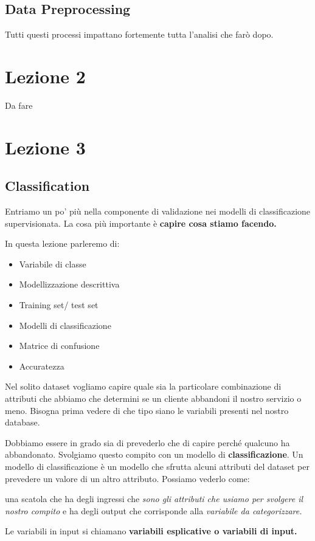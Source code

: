 \documentclass[12pt, a4paper,titlepage,openany]{article}
\begin{document}
\subsection{Data Preprocessing}

Tutti questi processi impattano fortemente tutta l'analisi che farò dopo.
\section{Lezione 2}
Da fare
\section{Lezione 3}
\subsection{Classification}
Entriamo un po' più nella componente di validazione nei modelli di classificazione supervisionata.
La cosa più importante è \textbf{capire cosa stiamo facendo.}

In questa lezione parleremo di:
\begin{itemize}
	\item Variabile di classe
	\item Modellizzazione descrittiva
	\item Training set/ test set
	\item Modelli di classificazione
	\item Matrice di confusione
	\item Accuratezza
\end{itemize}

Nel solito dataset vogliamo capire quale sia la particolare combinazione di attributi che abbiamo che determini se un cliente abbandoni il nostro servizio o meno.
Bisogna prima vedere di che tipo siano le variabili presenti nel nostro database.

Dobbiamo essere in grado sia di prevederlo che di capire perché qualcuno ha abbandonato. Svolgiamo questo compito con un modello di \textbf{classificazione}. Un modello di classificazione è un modello che sfrutta alcuni attributi del dataset per prevedere un valore di un altro attributo.
Possiamo vederlo come:

una scatola che ha degli ingressi che \textit{sono gli attributi che usiamo per svolgere il nostro compito} e ha degli output che corrisponde alla \textit{variabile da categorizzare.}

Le variabili in input si chiamano \textbf{variabili esplicative o variabili di input.}
\end{document}
